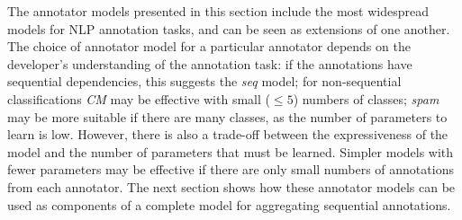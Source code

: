 The annotator models presented in this section 
include the most widespread models for NLP annotation tasks, 
and can be seen as extensions of one another.
The choice of annotator model for a particular annotator
 depends on the developer's understanding of the annotation task: 
 if the annotations have sequential dependencies, this suggests the \emph{seq} model;
for non-sequential classifications \emph{CM} may be effective with small ($\leq 5$) 
numbers of classes; \emph{spam} may be more suitable if there are many classes, as the number of parameters to learn is low. 
However, there is also a trade-off between the expressiveness of the model and the
number of parameters that must be learned. Simpler models with fewer parameters
may be effective if there are only small numbers of annotations from each annotator. 
The next section shows how these annotator models can be used as components of 
a complete model for aggregating sequential annotations. 
